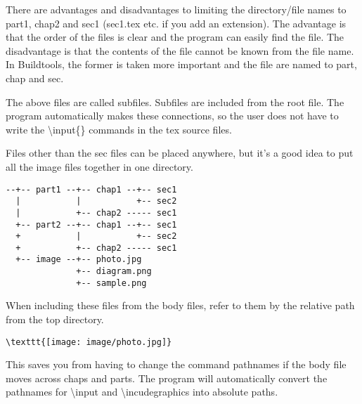 There are advantages and disadvantages to limiting the directory/file
names to part1, chap2 and sec1 (sec1.tex etc. if you add an extension).
The advantage is that the order of the files is clear and the program
can easily find the file. The disadvantage is that the contents of the
file cannot be known from the file name. In Buildtools, the former is
taken more important and the file are named to part, chap and sec.

The above files are called subfiles. Subfiles are included from the root
file. The program automatically makes these connections, so the user
does not have to write the {\textbackslash}input\{\} commands in the tex
source files.

Files other than the sec files can be placed anywhere, but it's a good
idea to put all the image files together in one directory.

\begin{verbatim}
--+-- part1 --+-- chap1 --+-- sec1
  |           |           +-- sec2
  |           +-- chap2 ----- sec1
  +-- part2 --+-- chap1 --+-- sec1
  +           |           +-- sec2
  +           +-- chap2 ----- sec1
  +-- image --+-- photo.jpg
              +-- diagram.png
              +-- sample.png
\end{verbatim}

When including these files from the body files, refer to them by the
relative path from the top directory.

\begin{verbatim}
\texttt{[image: image/photo.jpg]}
\end{verbatim}

This saves you from having to change the command pathnames if the body
file moves across chaps and parts. The program will automatically
convert the pathnames for {\textbackslash}input and
{\textbackslash}incudegraphics into absolute paths.
